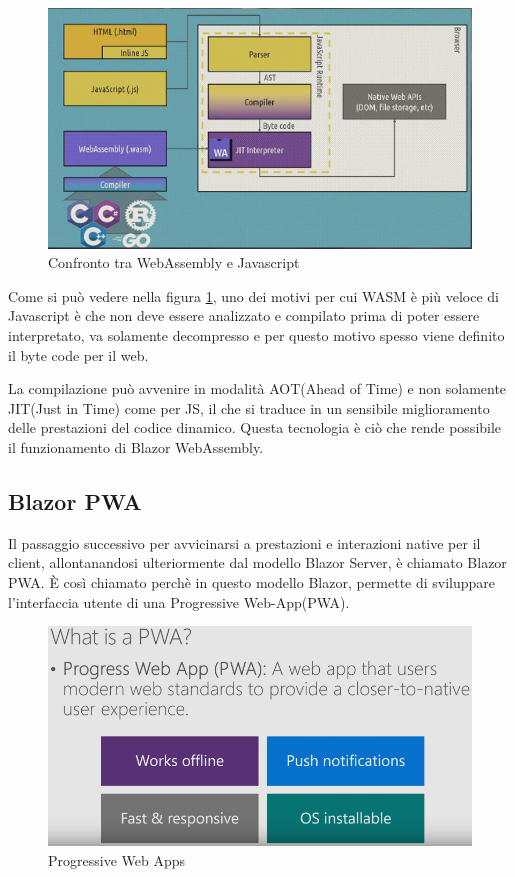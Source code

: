 \begin{figure}[H]
	\centerline{\includegraphics[scale=0.7]{figure/WasmVSJavascript.PNG}}
	\caption{Confronto tra WebAssembly e Javascript}
	\label{fig:WasmVSJavascript}
\end{figure}

Come si pu\`o vedere nella figura \ref{fig:WasmVSJavascript}, uno dei motivi per cui WASM \`e pi\`u veloce di Javascript \`e che non deve essere analizzato e compilato prima di poter essere interpretato, va solamente decompresso e per questo motivo spesso viene definito il byte code per il web.

La compilazione pu\`o avvenire in modalit\`a AOT(Ahead of Time) e non solamente JIT(Just in Time) come per JS, il che si traduce in un sensibile miglioramento delle prestazioni del codice dinamico.
Questa tecnologia \`e ci\`o che rende possibile il funzionamento di Blazor WebAssembly.

\subsection{Blazor PWA}\label{sez:bpwa}
Il passaggio successivo per avvicinarsi a prestazioni e interazioni native per il client, allontanandosi ulteriormente dal modello Blazor Server, \`e chiamato Blazor PWA.
\`E cos\`i chiamato perch\`e in questo modello Blazor, permette di sviluppare l'interfaccia utente di una Progressive Web-App(PWA).

\begin{figure}[H]
	\centerline{\includegraphics[scale=0.5]{figure/ProgressiveWebApp.png}}
	\caption{Progressive Web Apps}
	\label{fig:WhatIsAPWA}
\end{figure}

